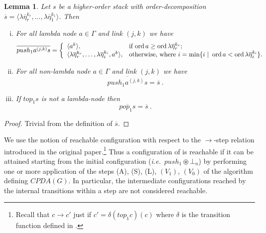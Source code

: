 \documentclass{article}
\newcommand{\ord}{\mathop{\mathrm{ord}}}
\newcommand{\theroot}{\circledast} %
\newtheorem{lemma}{Lemma}[section]
\theoremstyle{remark}
\theoremstyle{definition}
\newcommand\orddec\overline
\def\ie{{\it i.e.}\ }
\begin{document}
\begin{lemma}
\label{lem:push1pop1_orderdecompo} Let $s$ be a higher-order stack
with order-decomposition $\orddec{s} = \langle \lambda
\overline{\eta}_r^{k_r}, \ldots, \lambda \overline{\eta}_1^{k_1}
\rangle$. Then
\begin{enumerate}[i.]
\item For all lambda node $a \in \Gamma$ and link $(j,k)$ we have
 $$ \orddec{push_1 a^{(j,k)} s} = \left\{
                                       \begin{array}{ll}
                                        \langle a^k \rangle, &  \hbox{if $\ord{a} \geq \ord{\lambda \overline{\eta}_r^{k_r}}$}; \\
                                         \langle \lambda \overline{\eta}_r^{k_r}, \ldots, \lambda
\overline{\eta}_i^{k_i}, a^k \rangle, & \hbox{otherwise, where $i = \min \{ i \ | \ \ord{a} <
\ord{\lambda \overline{\eta}_i^{k_i}} \}$.}
                                       \end{array}
                                     \right.$$

\item For all non-lambda node $a \in \Gamma$ and link $(j,k)$ we have
$$ \orddec{push_1 a^{(j,k)} s} = \orddec{s} \ .$$

\item If $top_1 s$ is not a lambda-node then
$$ \orddec{pop_1 s} = \orddec{s} \ .$$
\end{enumerate}
\end{lemma}
\begin{proof}
  Trivial from the definition of  $\orddec{s}$.
\end{proof}


We use the notion of reachable configuration 
with respect to the $\rightarrow$-step relation introduced in the original paper.\footnote{Recall that $c\rightarrow c'$
just if $c' = \delta(top_1 c)(c)$ where $\delta$ is the transition
function defined in \cite[Figure 2]{hague-sto07}.} Thus a configuration of is reachable if it can be attained starting from the initial configuration (\ie $push_1 \theroot \bot_n$) by performing one or more application of the steps (A), (S), (L), $(V_1)$, $(V_0)$ of the algorithm defining $CPDA(G)$.
In particular, the intermediate configurations reached by the internal transitions within a step are not considered reachable.
\end{document}
